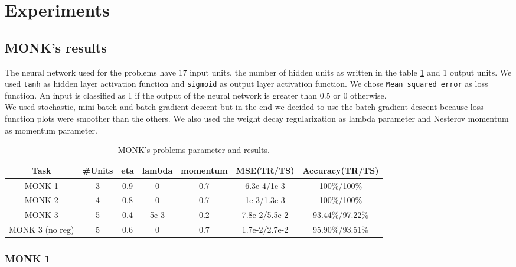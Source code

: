 \section{Experiments}


\subsection{MONK's results}

The neural network used for the problems have 17 input units, the number of hidden units as written in the table \ref{tab:dati} and 1 output units. We used \texttt{tanh} as hidden layer activation function and \texttt{sigmoid} as output layer activation function. We chose \texttt{Mean squared error} as loss function. An input is classified as 1 if the output of the neural network is greater than 0.5 or 0 otherwise.\\
We used stochastic, mini-batch and batch gradient descent but in the end we decided to use the batch gradient descent because loss function plots were smoother than the others.
We also used the weight decay regularization as lambda parameter and Nesterov momentum as momentum parameter.
\begin{table}[H]
\begin{tabular}{|c|c|c|c|c|c|c|}
\hline
\textbf{Task} &	\textbf{\#Units} &\textbf{ eta} & \textbf{lambda} &\textbf{momentum} & {\textbf{MSE(TR/TS)}} &\textbf{Accuracy(TR/TS)} \\ \hline
MONK 1        &    3 & 0.9 & 0 & 0.7  &   6.3e-4/1e-3 &   100\%/100\%  \\ \hline
MONK 2        &    4 & 0.8 & 0 & 0.7  &   1e-3/1.3e-3 &   100\%/100\% \\ \hline               
MONK 3        &    5 & 0.4 &5e-3 &0.2&     7.8e-2/5.5e-2&    93.44\%/97.22\%  \\ \hline
MONK 3 (no reg)&   5 & 0.6 &   0 &  0.7 &   1.7e-2/2.7e-2 & 95.90\%/93.51\%		\\ \hline              
\end{tabular}
\caption{MONK's problems parameter and results.}
\label{tab:dati}
\end{table}
\subsubsection{MONK 1}

